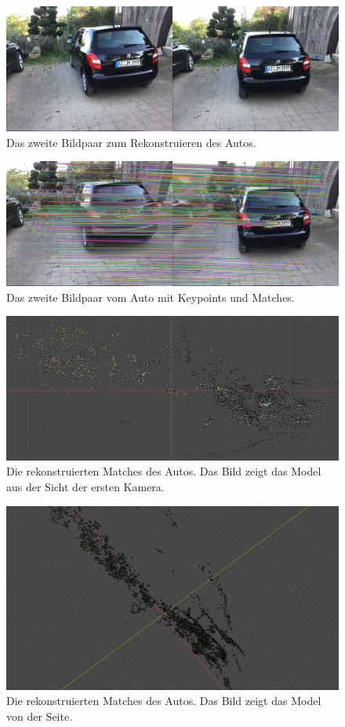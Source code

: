 \begin{figure}[b]
    \includegraphics[width=\textwidth]{src/img/car_second_pair.jpg}
    \caption{Das zweite Bildpaar zum Rekonstruieren des Autos.}
    \label{fig:car-second-pair}
\end{figure}

\begin{figure}
    \includegraphics[width=\textwidth]{src/img/car_second_pair_with_matches.jpg}
    \caption{Das zweite Bildpaar vom Auto mit Keypoints und Matches.}
    \label{fig:car-second-pair-with-matches}
\end{figure}

\begin{figure}
    \includegraphics[width=\textwidth]{src/img/car_model.jpg}
    \caption{Die rekonstruierten Matches des Autos. Das Bild zeigt das Model aus der Sicht der ersten Kamera.}
    \label{fig:car-model}
\end{figure}

\begin{figure}
    \includegraphics[width=\textwidth]{src/img/car_model_2.jpg}
    \caption{Die rekonstruierten Matches des Autos. Das Bild zeigt das Model von der Seite.}
    \label{fig:car-model-2}
\end{figure}
